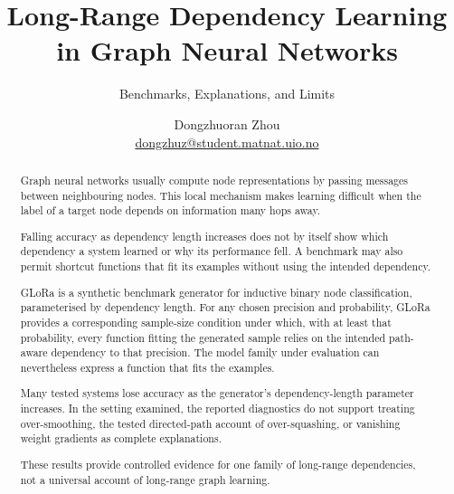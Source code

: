\documentclass[UKenglish, thumbmarks]{uiophdthesis}
\title{Long-Range Dependency Learning in Graph Neural Networks}
\subtitle{Benchmarks, Explanations, and Limits}
\author{Dongzhuoran Zhou\\ \url{dongzhuz@student.matnat.uio.no}}
\begin{document}
\maketitle[
  dept={Department of Informatics},
  fac={Faculty of Mathematics and Natural Sciences},
  supervisors={Egor V. Kostylev and Evgeny Kharlamov},
  year={2026}
]

\frontmatter

\begin{abstract}
Graph neural networks usually compute node representations by passing messages between neighbouring nodes.
This local mechanism makes learning difficult when the label of a target node depends on information many hops away.

Falling accuracy as dependency length increases does not by itself show which dependency a system learned or why its performance fell.
A benchmark may also permit shortcut functions that fit its examples without using the intended dependency.

GLoRa is a synthetic benchmark generator for inductive binary node classification, parameterised by dependency length.
For any chosen precision and probability, GLoRa provides a corresponding sample-size condition under which, with at least that probability, every function fitting the generated sample relies on the intended path-aware dependency to that precision.
The model family under evaluation can nevertheless express a function that fits the examples.

Many tested systems lose accuracy as the generator's dependency-length parameter increases.
In the setting examined, the reported diagnostics do not support treating over-smoothing, the tested directed-path account of over-squashing, or vanishing weight gradients as complete explanations.

These results provide controlled evidence for one family of long-range dependencies, not a universal account of long-range graph learning.
\end{abstract}
\end{document}
